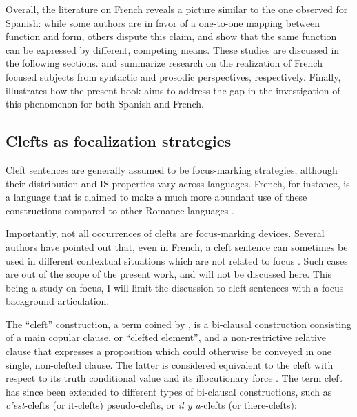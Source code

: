 Overall, the literature on French reveals a picture similar to the one observed for Spanish: while some authors are in favor of a one-to-one mapping between function and form, others dispute this claim, and show that the same function can be expressed by different, competing means. These studies are discussed in the following sections.  and  summarize research on the realization of French focused subjects from syntactic and prosodic perspectives, respectively. Finally,  illustrates how the present book aims to address the gap in the investigation of this phenomenon for both Spanish and French.

\subsection{Clefts as focalization strategies} \label{sub:3.3.1}
Cleft sentences are generally assumed to be  focus-marking strategies, although their distribution and IS-properties vary across languages. French, for instance, is a language that is claimed to make a much more abundant use of these constructions compared to other Romance languages \parencite{katz2000categories, dufter2009clefting, decesare2016sintassi, garassino2022pragmatic_interference}.

Importantly, not all occurrences of clefts are focus-marking devices. Several authors have pointed out that, even in French, a cleft sentence can sometimes be used in different contextual situations which are not related to focus \parencite{prince1978comparison, hedberg1990discourse, delin1992properties, dufter2009focus, mertens2012prosodie}.
Such cases are out of the scope of the present work, and will not be discussed here. This being a study on focus, I will limit the discussion to cleft sentences with a focus-background articulation.

The ``cleft” construction, a term coined by \textcite{jespersen1927modern}, is a bi-clausal construction consisting of a main copular clause, or “clefted element”, and a non-restrictive relative clause that expresses a proposition which could otherwise be conveyed in one single, non-clefted clause. The latter is considered equivalent to the cleft with respect to its truth conditional value and its illocutionary force \parencite[457]{lambrecht2001framework}. The term cleft has since been extended to different types of bi-clausal constructions, such as \textit{c'est}-clefts (or it-clefts) pseudo-clefts, or \textit{il y a}-clefts (or there-clefts):


